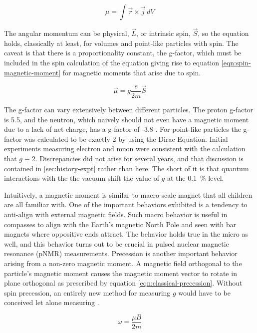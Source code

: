 \begin{equation}
\label{eqn:magnetic-moment-integral}
\mu = \int \vec{r} \times \vec{j} \,dV
\end{equation}

\noindent
The angular momentum can be physical, $\vec{L}$, or intrinsic spin, $\vec{S}$, so the equation holds, classically at least, for volumes and point-like particles with spin. The caveat is that there is a proportionality constant, the g-factor, which must be included in the spin calculation of the equation giving rise to equation \ref{eqn:spin-magnetic-moment} for magnetic moments that arise due to spin.

\begin{equation}
\label{eqn:spin-magnetic-moment}
\vec{\mu} = g \frac{e}{2m}\vec{S}
\end{equation}

The g-factor can vary extensively between different particles.  The proton g-factor is 5.5, and the neutron, which naively should not even have a magnetic moment due to a lack of net charge, has a g-factor of -3.8 \cite{codata}.  For point-like particles the g-factor was calculated to be exactly 2 by using the Dirac Equation.  Initial experiments measuring electron and muon \gmtwo were consistent with the calculation that $g \equiv 2$.  Discrepancies did not arise for several years, and that discussion is contained in \ref{sec:history-expt} rather than here.  The short of it is that quantum interactions with the the vacuum shift the value of $g$ at the \SI{0.1}{\percent} level.

Intuitively, a magnetic moment is similar to macro-scale magnet that all children are all familiar with.  One of the important behaviors exhibited is a tendency to anti-align with external magnetic fields.  Such macro behavior is useful in compasses to align with the Earth's magnetic North Pole and seen with bar magnets where oppositive ends attract.  The behavior holds true in the micro as well, and this behavior turns out to be crucial in pulsed nuclear magnetic resonance (pNMR) measurements.  Precession is another important behavior arising from a non-zero magnetic moment.  A magnetic field orthogonal to the particle's magnetic moment causes the magnetic moment vector to rotate in plane orthogonal as prescribed by equation \ref{eqn:classical-precession}. Without spin precession, an entirely new method for measuring $g$ would have to be conceived let alone measuring \gmtwo {}.

\begin{equation}
\label{eqn:classical-precession}
\omega = \frac{\mu B}{2 m}
\end{equation}

